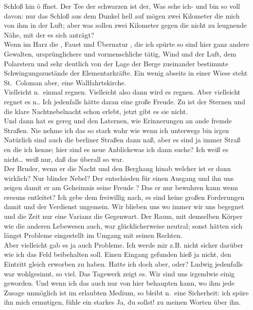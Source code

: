 \documentclass[
]{article}
\begin{document}
\begin{enumerate}
  Schloß hin ö ffnet. Der Tee der schwarzen ist der, Was sehe ich- und
  bin so voll davon: nur das Schloß aus dem Dunkel hell auf mögen zwei
  Kilometer die mich von ihm in der Luft; aber was sollen zwei Kilometer
  gegen die nicht zu leugnende Nähe, mit der es sich anträgt?\\
  Wenn im Harz die , Faust und Übernatur , die ich spürte so sind hier
  ganz andere Gewalten, ursprünglichere und vormenschliche tätig, Wind
  und der Luft, dem Polarstern und sehr deutlich von der Lage der Berge
  zueinander bestimmte Schwingungszustände der Elementarkräfte. Ein
  wenig abseits in einer Wiese steht St.~Coloman aber, eine
  Wallfahrtskirche.\\
  Vielleicht n.~einmal regnen. Vielleicht also dann wird es regnen. Aber
  vielleicht regnet es n.. Ich jedenfalls hätte daran eine große Freude.
  Zu ist der Sternen und die klare Nachtnebelnacht schon erlebt, jetzt
  gibt es sie nicht.\\
  Und dann hat es gereg und den Laternen, wie Erinnerungen an ande
  fremde Straßen. Nie nehme ich das so stark wahr wie wenn ich unterwegs
  bin irgen Natürlich sind auch die berliner Straßen dann naß, aber es
  sind ja immer Straß en die ich kenne; hier sind es neue Anblickewas
  ich dann suche? Ich weiß es nicht\ldots{} weiß nur, daß das überall so
  war.\\
  Der Bruder, wenn er die Nacht und den Berghang hinab welcher ist er
  dann wirklich? Nur blinder Nebel? Der entschieden für einen Ausgang
  und ihn uns zeigen damit er am Geheimnis seine Freude ? Das er nur
  bewahren kann wenn eresuns entleitet? Ich gebe dem freiwillig nach, es
  sind keine großen Forderungen damit und der Verdienst ungemein. Wir
  blieben uns wo immer wir uns begegnet und die Zeit nur eine Varianz
  die Gegenwart. Der Raum, mit demselben Körper wie die anderen
  Lebewesen auch, war glücklicherweise neutral; sonst hätten sich längst
  Probleme eingestellt im Umgang mit seinen Rechten.\\
  Aber vielleicht gab es ja auch Probleme. Ich werde mir z.B. nicht
  sicher darüber wie ich das Feld beibehalten soll. Einen Eingang
  gefunden hieß ja nicht, den Eintritt gleich erworben zu haben. Hatte
  ich doch aber, oder? Ludwig jedenfalls war wohlgesinnt, so viel. Das
  Tagewerk zeigt es. Wir sind uns irgendwie einig geworden. Und wenn ich
  das auch nur von hier behaupten kann, wo ihm jede Zusage unmöglich ist
  im erlaubten Medium, so bleibt n.~eine Sicherheit: ich spüre ihn mich
  ermutigen, fühle ein starkes Ja, du sollst! zu meinen Worten über ihn.

\end{enumerate}
\end{document}
